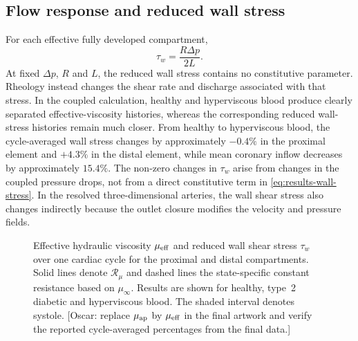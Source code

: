\documentclass[lineno]{jfm}
\begin{document}
\subsection{Flow response and reduced wall stress}
\label{sec:results-wall-loading}
For each effective fully developed compartment,
\begin{equation}
\tau_w
=
\frac{R\Delta p}{2L}.
\label{eq:results-wall-stress}
\end{equation}
At fixed $\Delta p$, $R$ and $L$, the reduced wall stress contains no
constitutive parameter. Rheology instead changes the shear rate and discharge
associated with that stress.
In the coupled calculation, healthy and hyperviscous blood produce clearly
separated effective-viscosity histories,
whereas the corresponding reduced wall-stress histories remain much closer.
From healthy to hyperviscous blood, the cycle-averaged wall stress changes by
approximately $-0.4\%$ in the proximal element and $+4.3\%$ in the distal
element, while mean coronary inflow decreases by approximately $15.4\%$.
The non-zero changes in $\tau_w$ arise from changes in the coupled pressure
drops, not from a direct constitutive term in
\eqref{eq:results-wall-stress}. In the resolved three-dimensional arteries,
the wall shear stress also changes indirectly because the outlet closure
modifies the velocity and pressure fields.
\begin{figure}
    \centering
    \fbox{
    \rule{0pt}{0.35\textheight}
    \rule{0.92\textwidth}{0pt}
    }
    \caption{Effective hydraulic viscosity $\mu_{\rm eff}$ and reduced wall
    shear stress $\tau_w$ over one cardiac cycle for the proximal and distal
    compartments. Solid lines denote $\mathcal{R}_{\mu}$ and dashed lines the
    state-specific constant resistance based on $\mu_\infty$. Results are shown
    for healthy, type~2 diabetic and hyperviscous blood. The shaded interval
    denotes systole.
    {\color{red}[Oscar: replace $\mu_{\rm ap}$ by $\mu_{\rm eff}$ in the final
    artwork and verify the reported cycle-averaged percentages from the final
    data.]}}
    \label{fig:cycle-viscosity-wallstress}
\end{figure}
\end{document}
